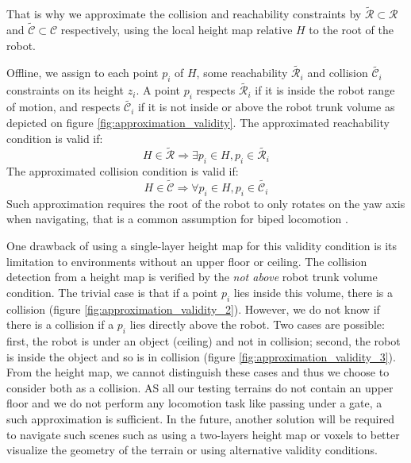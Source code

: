 That is why we approximate the collision and reachability constraints by $\tilde{\mathcal{R}} \subset \mathcal{R}$ and $\tilde{\mathcal{C}} \subset \mathcal{C}$ respectively, using the local height map relative $H$ to the root of the robot.

Offline, we assign to each point $p_i$ of $H$, some reachability $\tilde{\mathcal{R}_i}$ and collision $\tilde{\mathcal{C}_i}$ constraints on its height $z_i$. 
A point $p_i$ respects $\tilde{\mathcal{R}_i}$ if it is inside the robot range of motion, and respects $\tilde{\mathcal{C}_i}$ if it is not inside or above the robot trunk volume as depicted on figure \ref{fig:approximation_validity}. 
The approximated reachability condition is valid if:
\begin{equation}
    H \in \tilde{\mathcal{R}} \Rightarrow \exists p_i \in H, p_i \in \tilde{\mathcal{R}_i}
\end{equation}
The approximated collision condition is valid if:
\begin{equation}
    H \in \tilde{\mathcal{C}} \Rightarrow \forall p_i \in H, p_i \in \tilde{\mathcal{C}_i}
\end{equation}
Such approximation requires the root of the robot to only rotates on the yaw axis when navigating, that is a common assumption for biped locomotion \cite{deits2014FootPlanMI}.

One drawback of using a single-layer height map for this validity condition is its limitation to environments without an upper floor or ceiling.
The collision detection from a height map is verified by the \textit{not above} robot trunk volume condition. 
The trivial case is that if a point $p_i$ lies inside this volume, there is a collision (figure \ref{fig:approximation_validity_2}). However, we do not know if there is a collision if a $p_i$ lies directly above the robot. 
Two cases are possible: first, the robot is under an object (ceiling) and not in collision; second, the robot is inside the object and so is in collision (figure \ref{fig:approximation_validity_3}).
From the height map, we cannot distinguish these cases and thus we choose to consider both as a collision.
AS all our testing terrains do not contain an upper floor and we do not perform any locomotion task like passing under a gate, a such approximation is sufficient. 
In the future, another solution will be required to navigate such scenes such as using a two-layers height map or voxels to better visualize the geometry of the terrain or using alternative validity conditions.

